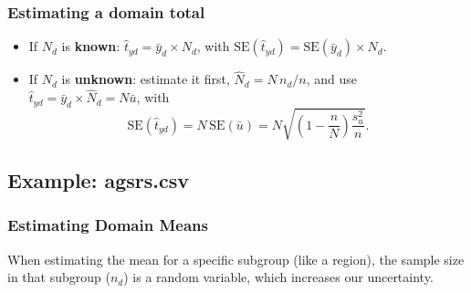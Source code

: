 \documentclass[
  letterpaper,
  DIV=11,
  numbers=noendperiod]{scrreprt}
\providecommand{\tightlist}{%
  \setlength{\itemsep}{0pt}\setlength{\parskip}{0pt}}
\renewcommand{\[}{\begin{equation}}
\renewcommand{\]}{\end{equation}}
\begin{document}
\subsubsection{Estimating a domain
total}\label{estimating-a-domain-total}

\begin{itemize}
\tightlist
\item
  If \(N_d\) is \textbf{known}: \(\hat t_{yd} = \bar y_d \times N_d\),
  with \(\text{SE}(\hat t_{yd}) = \text{SE}(\bar y_d) \times N_d\).
\item
  If \(N_d\) is \textbf{unknown}: estimate it first,
  \(\hat N_d = N\,n_d/n\), and use
  \(\hat t_{yd} = \bar y_d \times \hat N_d = N\bar u\), with \[
  \text{SE}(\hat t_{yd}) = N\,\text{SE}(\bar u) = N\sqrt{\left(1 - \frac nN\right)\frac{s_u^2}{n}} .
  \]
\end{itemize}

\subsection{Example: agsrs.csv}\label{example-agsrs.csv}

\subsubsection{Estimating Domain Means}\label{estimating-domain-means}

When estimating the mean for a specific subgroup (like a region), the
sample size in that subgroup (\(n_d\)) is a random variable, which
increases our uncertainty.
\end{document}
